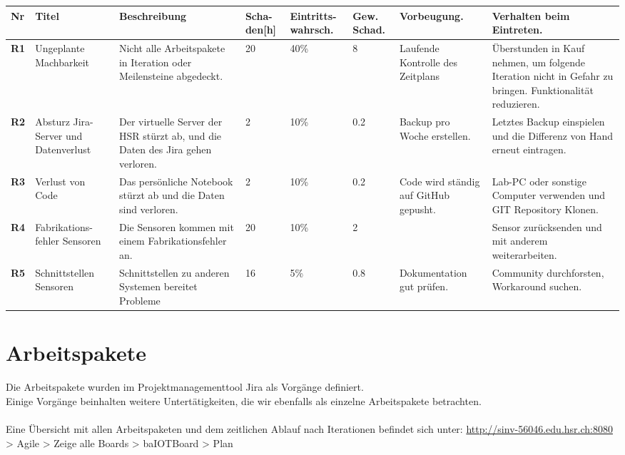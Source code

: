 \begin{landscape}
	\begin{tabularx}{\linewidth}{lp{2cm}Xp{1cm}p{1.5cm}p{1.5cm}XX}
	\textbf{Nr}	& \textbf{Titel} & \textbf{Beschreibung} & \textbf{Scha-den[h]} & \textbf{Eintritts-wahrsch.} & \textbf{Gew. Schad.} & \textbf{Vorbeugung.} & \textbf{Verhalten beim Eintreten.}\\
	\hline
	\textbf{R1} & Ungeplante Machbarkeit	& Nicht alle Arbeitspakete in Iteration oder Meilensteine abgedeckt.	& 20 & 40\% & 8 & Laufende Kontrolle des Zeitplans & Überstunden in Kauf nehmen, um folgende Iteration nicht in Gefahr zu bringen. Funktionalität reduzieren. \\ \hline
	\textbf{R2} & Absturz Jira-Server und Datenverlust	& Der virtuelle Server der HSR stürzt ab, und die Daten des Jira gehen verloren. & 2 & 10\% & 0.2 & Backup pro Woche erstellen. & Letztes Backup einspielen und die Differenz von Hand erneut eintragen. \\ \hline
	\textbf{R3} & Verlust von Code & Das persönliche Notebook stürzt ab und die Daten sind verloren. & 2 & 10\% & 0.2 & Code wird ständig auf GitHub gepusht. & Lab-PC oder sonstige Computer verwenden und GIT Repository Klonen. \\ \hline
	\textbf{R4} & Fabrikations-fehler Sensoren & Die Sensoren kommen mit einem Fabrikationsfehler an. & 20 & 10\% & 2 & & Sensor zurücksenden und mit anderem weiterarbeiten. \\ \hline
	\textbf{R5} & Schnittstellen Sensoren & Schnittstellen zu anderen Systemen bereitet Probleme & 16 & 5\% & 0.8 & Dokumentation gut prüfen. & Community durchforsten, Workaround suchen. \\ \hline
\end{tabularx}
\end{landscape}

\section*{Arbeitspakete}
Die Arbeitspakete wurden im Projektmanagementtool Jira als Vorgänge definiert. \\
Einige Vorgänge beinhalten weitere Untertätigkeiten, die wir ebenfalls als einzelne Arbeitspakete betrachten. \\
\\
Eine Übersicht mit allen Arbeitspaketen und dem zeitlichen Ablauf nach Iterationen befindet sich unter: \url{http://sinv-56046.edu.hsr.ch:8080} > Agile > Zeige alle Boards > baIOTBoard > Plan

